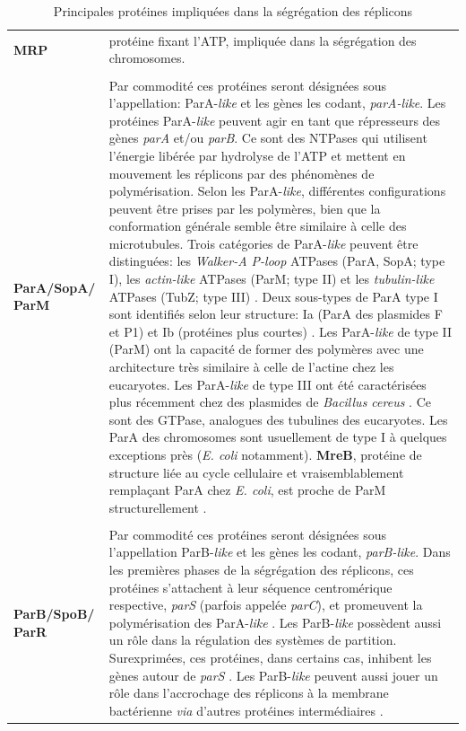  \begin{longtable}{@{\hspace{-2cm}\hspace{1cm}} >{\bfseries}p{} | >{\small}p{}}
\caption{Principales protéines impliquées dans la ségrégation des réplicons}\label{protseg}\\
\endfirsthead
  MRP & protéine fixant l'ATP, impliquée dans la ségrégation des chromosomes. \\
	\\[-0.2cm]
 ParA/SopA/ ParM & Par commodité ces protéines seront désignées sous l'appellation: ParA-\textit{like} et les gènes les codant, \textit{parA-like}. Les protéines ParA-\textit{like} peuvent agir en tant que répresseurs des gènes \textit{parA} et/ou \textit{parB}. Ce sont des NTPases qui utilisent l'énergie libérée par hydrolyse de l'ATP et mettent en mouvement les réplicons par des phénomènes de polymérisation. Selon les ParA-\textit{like}, différentes configurations peuvent être prises par les polymères, bien que la conformation générale semble être similaire à celle des microtubules. Trois catégories de ParA-\textit{like} peuvent être distinguées: les \textit{Walker-A P-loop} ATPases (ParA, SopA; type I), les \textit{actin-like} ATPases (ParM;  type II) et les \textit{tubulin-like} ATPases (TubZ; type III) \citep{Mierzejewska2012,funnell2004partition}. Deux sous-types de ParA type I sont identifiés selon leur structure: Ia (ParA des plasmides F et P1) et Ib (protéines plus courtes) \citep{Passot2012}. Les ParA-\textit{like} de type II (ParM) ont la capacité de former des polymères avec une architecture très similaire à celle de l'actine chez les eucaryotes. Les ParA-\textit{like} de type III ont été caractérisées plus récemment chez des plasmides de \textit{Bacillus cereus} \citep{zheng2013evolution}. Ce sont des GTPase, analogues des tubulines des eucaryotes. Les ParA des chromosomes sont usuellement de type I à quelques exceptions près (\textit{E. coli} notamment). \textbf{MreB}, protéine de structure liée au cycle cellulaire et vraisemblablement remplaçant ParA chez \textit{E. coli}, est proche de ParM structurellement \citep{Mierzejewska2012}.\\
	\\[-0.2cm]
  ParB/SpoB/ ParR & Par commodité ces protéines seront désignées sous l'appellation ParB-\textit{like} et les gènes les codant, \textit{parB-like}. Dans les premières phases de la ségrégation des réplicons, ces protéines s'attachent à leur séquence centromérique respective, \textit{parS} (parfois appelée \textit{parC}), et promeuvent la polymérisation des ParA-\textit{like} \citep{funnell2004partition}. Les ParB-\textit{like} possèdent aussi un rôle dans la régulation des systèmes de partition. Surexprimées, ces protéines, dans certains cas, inhibent les gènes autour de \textit{parS} \citep{funnell2004partition}. Les ParB-\textit{like} peuvent aussi jouer un rôle dans l'accrochage des réplicons à la membrane bactérienne \textit{via} d'autres protéines intermédiaires \citep{Toro2010,Mierzejewska2012}.
 \end{longtable}
 

